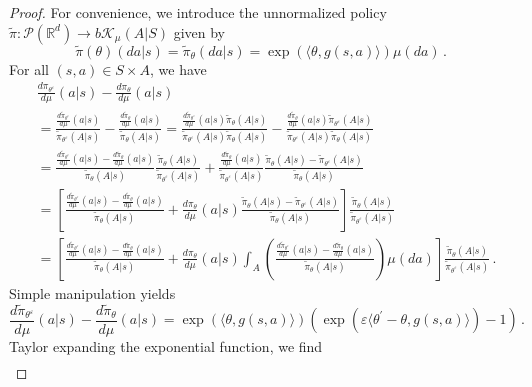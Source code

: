 \documentclass{amsart}
\theoremstyle{definition}
\begin{document}
\begin{proof}
For convenience, we introduce the unnormalized policy $\tilde{\pi}: \mathcal{P}(\mathbb{R}^d) \rightarrow b\mathcal{K}_{\mu}(A|S)$ given by
\[
\tilde{\pi}(\theta)(da|s)=\tilde{\pi}_{\theta}(da|s)=\exp\left(\langle \theta, g(s,a)\rangle\right)\mu(da)\,.
\]
For all $(s,a)\in S\times A$, we have
\begin{align*}
& \frac{d\pi_{\theta^{\varepsilon}}}{d\mu}(a|s)-\frac{d\pi_{\theta}}{d\mu}(a|s) \\
& =\frac{\frac{d\tilde{\pi}_{\theta^{\varepsilon}}}{d\mu}(a|s)}{\tilde{\pi}_{\theta^{\varepsilon}}(A|s)}-\frac{\frac{d\tilde{\pi}_{\theta}}{d\mu}(a|s)}{\tilde{\pi}_{\theta}(A|s)}=\frac{\frac{d\tilde{\pi}_{\theta^{\varepsilon}}}{d\mu}(a|s)\tilde{\pi}_{\theta}(A|s)}{\tilde{\pi}_{\theta^{\varepsilon}}(A|s)\tilde{\pi}_{\theta}(A|s)}-\frac{\frac{d\tilde{\pi}_{\theta}}{d\mu}(a|s)\tilde{\pi}_{\theta^{\varepsilon}}(A|s)}{\tilde{\pi}_{\theta^{\varepsilon}}(A|s)\tilde{\pi}_{\theta}(A|s)}\\
& =\frac{\frac{d\tilde{\pi}_{\theta^{\varepsilon}}}{d\mu}(a|s)-\frac{d\tilde{\pi}_{\theta}}{d\mu}(a|s)}{\tilde{\pi}_{\theta}(A|s)}\frac{\tilde{\pi}_{\theta}(A|s)}{\tilde{\pi}_{\theta^{\varepsilon}}(A|s)}+\frac{\frac{d\tilde{\pi}_{\theta}}{d\mu}(a|s)}{\tilde{\pi}_{\theta^{\varepsilon}}(A|s)}\frac{\tilde{\pi}_{\theta}(A|s)-\tilde{\pi}_{\theta^{\varepsilon}}(A|s)}{\tilde{\pi}_{\theta}(A|s)}\\
& =\left[\frac{\frac{d\tilde{\pi}_{\theta^{\varepsilon}}}{d\mu}(a|s)-\frac{d\tilde{\pi}_{\theta}}{d\mu}(a|s)}{\tilde{\pi}_{\theta}(A|s)}+\frac{d\pi_{\theta}}{d\mu}(a|s)\frac{\tilde{\pi}_{\theta}(A|s)-\tilde{\pi}_{\theta^{\varepsilon}}(A|s)}{\tilde{\pi}_{\theta}(A|s)}\right]\frac{\tilde{\pi}_{\theta}(A|s)}{\tilde{\pi}_{\theta^{\varepsilon}}(A|s)}\\
& =\left[\frac{\frac{d\tilde{\pi}_{\theta^{\varepsilon}}}{d\mu}(a|s)-\frac{d\tilde{\pi}_{\theta}}{d\mu}(a|s)}{\tilde{\pi}_{\theta}(A|s)}+\frac{d\pi_{\theta}}{d\mu}(a|s)\int_{A}\left(\frac{\frac{d\tilde{\pi}_{\theta^{\varepsilon}}}{d\mu}(a|s)-\frac{d\tilde{\pi}_{\theta}}{d\mu}(a|s)}{\tilde{\pi}_{\theta}(A|s)}\right)\mu(da)\right]\frac{\tilde{\pi}_{\theta}(A|s)}{\tilde{\pi}_{\theta^{\varepsilon}}(A|s)}\,.
\end{align*}
Simple manipulation yields
\[
\frac{d\tilde{\pi}_{\theta^{\varepsilon}}}{d\mu}(a|s)-\frac{d\tilde{\pi}_{\theta}}{d\mu}(a|s) =\exp\left(\langle\theta, g(s,a)\rangle\right)\left( \exp\left(\varepsilon\langle\theta^\prime - \theta, g(s,a)\rangle\right)-1\right)\,.
\]
Taylor expanding the exponential function, we find
\begin{align*}

\end{align*}
\end{proof}
\end{document}
